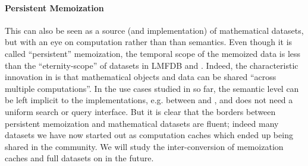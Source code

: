 \paragraph{Persistent Memoization}
This can also be seen as a source (and implementation) of mathematical datasets, but with an eye on computation rather than than semantics.
Even though it is called ``persistent'' memoization, the temporal scope of the memoized data is less than the ``eternity-scope'' of datasets in LMFDB and \dmh. Indeed, the characteristic innovation in  is that mathematical objects and data can be shared ``across multiple computations''.
In the use cases studied in \pn so far, the semantic level can be left implicit to the implementations, e.g. between \Sage and \GAP, and does not need a uniform search or query interface.
But it is clear that the borders between persistent memoization and mathematical datasets are fluent; indeed many datasets we have now started out as computation caches which ended up being shared in the community. 
We will study the inter-conversion of memoization caches and full datasets on \dmh in the future. 


